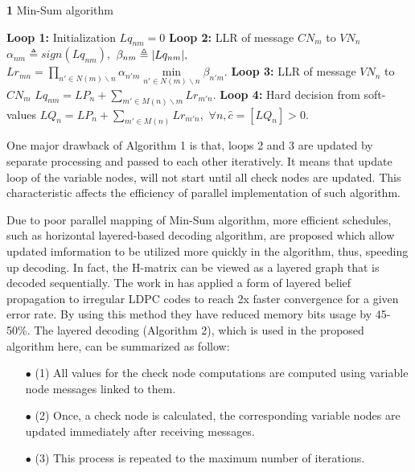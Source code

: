 \documentclass{article}
\DeclarePairedDelimiter\abs{\lvert}{\rvert}%
\begin{document}
\begin{algorithm}
\renewcommand\thealgorithm{}
\caption{\textbf{1} Min-Sum algorithm}\label{algorithm1}
\begin{algorithmic}[1]
\STATE \textbf{Loop 1:} Initialization
\STATE
$Lq_{nm}=0$%
\ENDFOR
{}
\STATE \textbf{Loop 2:} LLR of message $CN_m$ to $VN_n$
\STATE $\alpha_{nm} \triangleq sign(Lq_{nm}),$
\STATE $\beta_{nm} \triangleq \abs{Lq_{nm}},$
\STATE $Lr_{mn} = \prod\limits_{n' \in N(m)\backslash n} \alpha_{n'm} \min\limits_{n' \in N(m)\backslash n} \beta_{n'm}.$
\ENDFOR
\STATE \textbf{Loop 3:} LLR of message $VN_n$ to $CN_m$
\STATE $Lq_{nm} = LP_n + \sum\limits_{m' \in M(n)\backslash m} Lr_{m'n}.$
\ENDFOR  
\ENDFOR %
\STATE \textbf{Loop 4:} Hard decision from soft-values
\STATE $LQ_{n} = LP_n + \sum\limits_{m' \in M(n)} Lr_{m'n},$
\STATE $\forall n, \hat{c}=[LQ_n]>0.$
\ENDFOR
\end{algorithmic}
\addtocounter{algorithm}{-1}
\end{algorithm}

One major drawback of Algorithm 1 is that, loops 2 and 3 are updated by separate processing and passed to each other iteratively. It means that update loop of the variable nodes, will not start until all check nodes are updated. This characteristic affects the efficiency of parallel implementation of such algorithm. 

Due to poor parallel mapping of Min-Sum algorithm, more efficient schedules, such as horizontal layered-based decoding algorithm, are proposed which allow updated imformation to be utilized more quickly in the algorithm, thus, speeding up decoding\cite{art_layered0, art_layered1}. In fact, the H-matrix can be viewed as a layered graph that is decoded sequentially. The work in \cite{art_gpu_0} has applied a form of layered belief propagation to irregular LDPC codes to reach 2x faster convergence for a given error rate. By using this method they have reduced memory bits usage by 45-50\%. The layered decoding (Algorithm 2), which is used in the proposed algorithm here, can be summarized as follow:
\begin{enumerate}
\item[$\bullet$] (1) All values for the check node computations are computed using variable node messages linked to them.
\item[$\bullet$] (2) Once, a check node is calculated, the corresponding variable nodes are updated immediately after receiving messages.
\item[$\bullet$] (3) This process is repeated to the maximum number of iterations.
\end{enumerate}
\end{document}
